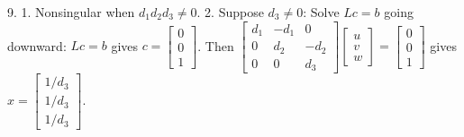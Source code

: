 9. 1. Nonsingular when \(d_{1}d_{2}d_{3}\neq 0\). 2. Suppose \(d_{3}\neq 0\): Solve \(Lc=b\) going downward: \(Lc=b\) gives \(c=\begin{bmatrix}0\\ 0\\ 1\end{bmatrix}\). Then \(\begin{bmatrix}d_{1}&-d_{1}&0\\ 0&d_{2}&-d_{2}\\ 0&0&d_{3}\end{bmatrix}\begin{bmatrix}u\\ v\\ w\end{bmatrix}=\begin{bmatrix}0\\ 0\\ 1\end{bmatrix}\) gives \(x=\begin{bmatrix}1/d_{3}\\ 1/d_{3}\\ 1/d_{3}\end{bmatrix}\).

 